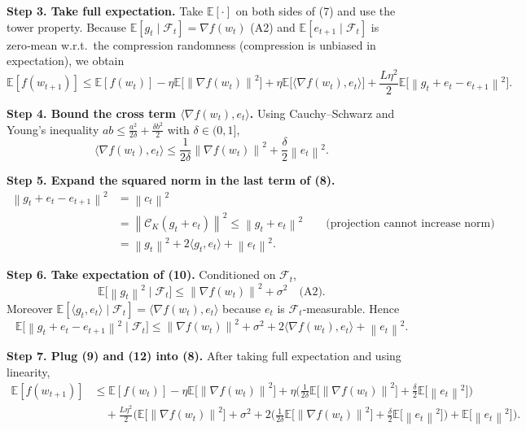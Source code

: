 \documentclass{article}
\newcommand{\E}{\mathbb{E}}
\newcommand{\norm}[1]{\left\|#1\right\|}
\newcommand{\grad}{\nabla}
\newcommand{\topk}[1]{\mathcal{C}_{K}(#1)}
\begin{document}
\noindent\textbf{Step 3. Take full expectation.}  
Take $\E[\cdot]$ on both sides of (7) and use the tower property.
Because $\E[g_t\mid\mathcal F_t]=\grad f(w_t)$ (A2) and $\E[e_{t+1}\mid\mathcal F_t]$ is zero‑mean w.r.t.\ the compression randomness (compression is unbiased in expectation), we obtain
\[
\E[f(w_{t+1})]\le \E[f(w_t)]
-\eta\E\!\big[\norm{\grad f(w_t)}^{2}\big]
+\eta\E\!\big[\langle\grad f(w_t),e_t\rangle\big]
+\frac{L\eta^{2}}{2}\E\!\big[\norm{g_t+e_t-e_{t+1}}^{2}\big].
\tag{8}
\]

\noindent\textbf{Step 4. Bound the cross term $\langle\grad f(w_t),e_t\rangle$.}  
Using Cauchy–Schwarz and Young’s inequality $ab\le \frac{a^{2}}{2\delta}+\frac{\delta b^{2}}{2}$ with $\delta\in(0,1]$,
\[
\langle\grad f(w_t),e_t\rangle
\le \frac{1}{2\delta}\norm{\grad f(w_t)}^{2}
+\frac{\delta}{2}\norm{e_t}^{2}.
\tag{9}
\]

\noindent\textbf{Step 5. Expand the squared norm in the last term of (8).}  
\[
\begin{aligned}
\norm{g_t+e_t-e_{t+1}}^{2}
&= \norm{c_t}^{2} \\
&= \norm{\topk{g_t+e_t}}^{2}
\le \norm{g_t+e_t}^{2}   \qquad\text{(projection cannot increase norm)}\\
&= \norm{g_t}^{2}+2\langle g_t,e_t\rangle+\norm{e_t}^{2}.
\end{aligned}
\tag{10}
\]

\noindent\textbf{Step 6. Take expectation of (10).}  
Conditioned on $\mathcal F_t$,
\[
\E\!\big[\norm{g_t}^{2}\mid\mathcal F_t\big]\le \norm{\grad f(w_t)}^{2}+\sigma^{2} \quad\text{(A2)}.
\tag{11}
\]
Moreover $\E[\langle g_t,e_t\rangle\mid\mathcal F_t]=\langle\grad f(w_t),e_t\rangle$ because $e_t$ is $\mathcal F_t$‑measurable. Hence
\[
\E\!\big[\norm{g_t+e_t-e_{t+1}}^{2}\mid\mathcal F_t\big]
\le \norm{\grad f(w_t)}^{2}+\sigma^{2}+2\langle\grad f(w_t),e_t\rangle+\norm{e_t}^{2}.
\tag{12}
\]

\noindent\textbf{Step 7. Plug (9) and (12) into (8).}  
After taking full expectation and using linearity,
\[
\begin{aligned}
\E[f(w_{t+1})] &\le \E[f(w_t)]
-\eta\E\!\big[\norm{\grad f(w_t)}^{2}\big]
+\eta\Big(\frac{1}{2\delta}\E\!\big[\norm{\grad f(w_t)}^{2}\big]
+\frac{\delta}{2}\E\!\big[\norm{e_t}^{2}\big]\Big)\\
&\quad+\frac{L\eta^{2}}{2}\Big(
\E\!\big[\norm{\grad f(w_t)}^{2}\big]+\sigma^{2}
+2\Big(\frac{1}{2\delta}\E\!\big[\norm{\grad f(w_t)}^{2}\big]
+\frac{\delta}{2}\E\!\big[\norm{e_t}^{2}\big]\Big)
+\E\!\big[\norm{e_t}^{2}\big]\Big).
\end{aligned}
\tag{13}
\]
\end{document}
